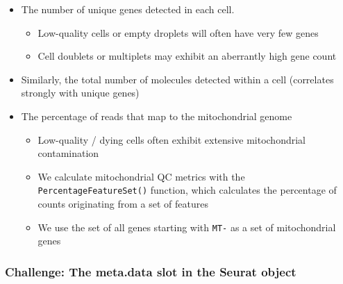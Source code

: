 \documentclass[
]{book}
\newenvironment{Shaded}{\begin{snugshade}}{\end{snugshade}}
\newcommand{\AttributeTok}[1]{\textcolor[rgb]{0.13,0.29,0.53}{#1}}
\newcommand{\CommentTok}[1]{\textcolor[rgb]{0.56,0.35,0.01}{\textit{#1}}}
\newcommand{\FunctionTok}[1]{\textcolor[rgb]{0.13,0.29,0.53}{\textbf{#1}}}
\newcommand{\NormalTok}[1]{#1}
\newcommand{\OtherTok}[1]{\textcolor[rgb]{0.56,0.35,0.01}{#1}}
\newcommand{\SpecialCharTok}[1]{\textcolor[rgb]{0.81,0.36,0.00}{\textbf{#1}}}
\newcommand{\StringTok}[1]{\textcolor[rgb]{0.31,0.60,0.02}{#1}}
\providecommand{\tightlist}{%
  \setlength{\itemsep}{0pt}\setlength{\parskip}{0pt}}
\begin{document}
\begin{itemize}
\tightlist
\item
  The number of unique genes detected in each cell.

  \begin{itemize}
  \tightlist
  \item
    Low-quality cells or empty droplets will often have very few genes
  \item
    Cell doublets or multiplets may exhibit an aberrantly high gene count
  \end{itemize}
\item
  Similarly, the total number of molecules detected within a cell (correlates strongly with unique genes)
\item
  The percentage of reads that map to the mitochondrial genome

  \begin{itemize}
  \tightlist
  \item
    Low-quality / dying cells often exhibit extensive mitochondrial contamination
  \item
    We calculate mitochondrial QC metrics with the \texttt{PercentageFeatureSet()} function, which calculates the percentage of counts originating from a set of features
  \item
    We use the set of all genes starting with \texttt{MT-} as a set of mitochondrial genes
  \end{itemize}
\end{itemize}

\begin{Shaded}
\end{Shaded}

\hypertarget{challenge-the-meta.data-slot-in-the-seurat-object}{%
\subsubsection*{Challenge: The meta.data slot in the Seurat object}\label{challenge-the-meta.data-slot-in-the-seurat-object}}
\end{document}
